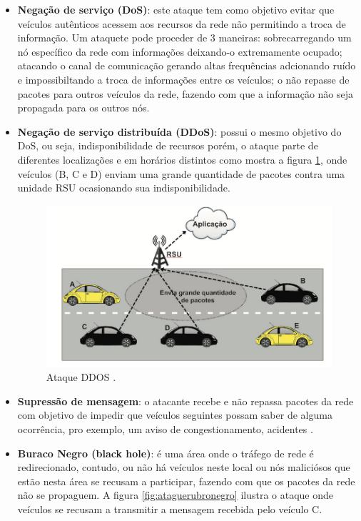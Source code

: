 \documentclass[
	12pt,				%
	oneside,			%
	a4paper,			%
	english,			%
	brazil				%
	]{abntex2ppgsi}
\begin{document}
\begin{itemize}
	\item {\textbf{Negação de serviço (DoS)}: este ataque tem como objetivo evitar que veículos autênticos acessem aos recursos da rede não permitindo a troca de informação. Um ataquete pode proceder de 3 maneiras: sobrecarregando um nó específico da rede com informações deixando-o extremamente ocupado; atacando o canal de comunicação gerando altas frequências adcionando ruído e impossibiltando a troca de informações entre os veículos; o não repasse de pacotes para outros veículos da rede, fazendo com que a informação não seja propagada para os outros nós}.
	
	\item {\textbf{Negação de serviço distribuída (DDoS)}: possui o mesmo objetivo do DoS, ou seja, indisponibilidade de recursos porém, o ataque parte de diferentes localizações e em horários distintos como mostra  a figura \ref{fig:ataqueddos}, onde veículos (B, C e D) enviam uma grande quantidade de pacotes contra uma unidade RSU ocasionando sua indisponibilidade.}

\begin{figure}[!h]
	\centering
	\includegraphics [width=12cm] {images/ataqueddos.png}
	\caption{Ataque DDOS \cite{wanghamsegurancca}.}
	\label{fig:ataqueddos}
\end{figure}
	
	\item {\textbf{Supressão de mensagem}: o atacante recebe e não repassa pacotes da rede com objetivo de impedir que veículos seguintes possam saber de alguma ocorrência, pro exemplo, um aviso de congestionamento, acidentes \cite{tangade2013survey}.}		

	\item {\textbf{Buraco Negro (black hole)}: é uma área onde o tráfego de rede é redirecionado, contudo, ou não há veículos neste local ou nós maliciósos que estão nesta área se recusam a participar, fazendo com que os pacotes da rede não se propaguem. A figura \ref{fig:ataguerubronegro} ilustra o ataque onde veículos se recusam a transmitir a mensagem recebida pelo veículo C.}		
	

\end{itemize}
\end{document}
